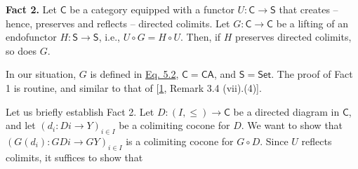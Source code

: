 \documentclass[11pt,a4paper]{amsart}
\begin{document}
\hypertarget{html:S7.I1.ix2}{}\textbf{Fact 2.}  %
\hypertarget{html:S7.I1.ix2.p1}{} Let %
\hypertarget{html:S7.I1.ix2.p1.m1}{}\({\mathsf{C}}\) be a category equipped with a functor %
\hypertarget{html:S7.I1.ix2.p1.m2}{}\({U\colon\mathsf{C}\to\mathsf{S}}\) that creates – hence, preserves and reflects – directed colimits. Let %
\hypertarget{html:S7.I1.ix2.p1.m3}{}\({G\colon\mathsf{C}\to\mathsf{C}}\) be a lifting of an endofunctor %
\hypertarget{html:S7.I1.ix2.p1.m4}{}\({H\colon\mathsf{S}\to\mathsf{S}}\), i.e., %
\hypertarget{html:S7.I1.ix2.p1.m5}{}\({U\circ G=H\circ U}\). Then, if %
\hypertarget{html:S7.I1.ix2.p1.m6}{}\({H}\) preserves directed colimits, so does %
\hypertarget{html:S7.I1.ix2.p1.m7}{}\({G}\).
\par\medskip
    In our situation, %
\hypertarget{html:S7.SS0.SSS0.P0.SPx1.p1.m1}{}\({G}\) is defined in \hyperlink{html:S5.E2}{Eq. 5.2}, %
\hypertarget{html:S7.SS0.SSS0.P0.SPx1.p1.m2}{}\({\mathsf{C}=\mathsf{CA}}\), and %
\hypertarget{html:S7.SS0.SSS0.P0.SPx1.p1.m3}{}\({\mathsf{S}=\mathsf{Set}}\). The proof of Fact 1 is routine, and similar to that of [\hyperlink{html:bib.bib1}{1}, Remark 3.4 (vii).(4)].
\par\medskip
\hypertarget{html:S7.SS0.SSS0.P0.SPx1.p2}{} Let us briefly establish Fact 2. Let %
\hypertarget{html:S7.SS0.SSS0.P0.SPx1.p2.m1}{}\({D\colon(I,\leq)\to\mathsf{C}}\) be a directed diagram in %
\hypertarget{html:S7.SS0.SSS0.P0.SPx1.p2.m2}{}\({\mathsf{C}}\), and let %
\hypertarget{html:S7.SS0.SSS0.P0.SPx1.p2.m3}{}\({(d_{i}\colon Di\to Y)_{i\in I}}\) be a colimiting cocone for %
\hypertarget{html:S7.SS0.SSS0.P0.SPx1.p2.m4}{}\({D}\). We want to show that %
\hypertarget{html:S7.SS0.SSS0.P0.SPx1.p2.m5}{}\({(G(d_{i})\colon GDi\to GY)_{i\in I}}\) is a colimiting cocone for %
\hypertarget{html:S7.SS0.SSS0.P0.SPx1.p2.m6}{}\({G\circ D}\). Since %
\hypertarget{html:S7.SS0.SSS0.P0.SPx1.p2.m7}{}\({U}\) reflects colimits, it suffices to show that %
\end{document}
